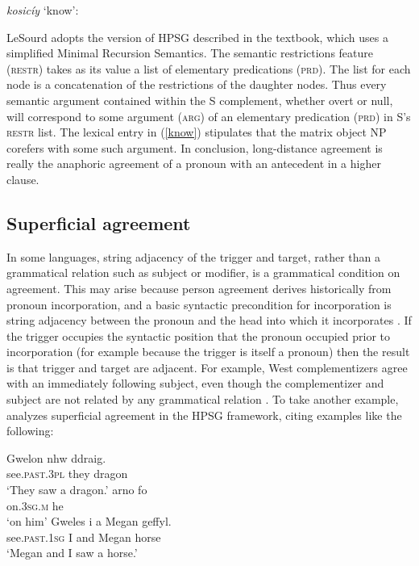 \documentclass[output=paper
 	        ,biblatex
                ,babelshorthands
                ,newtxmath
                ,draftmode
                ,colorlinks, citecolor=brown
]{langscibook}
\begin{document}
 \begin{exe}
\ex\label{know}
\textit{kosic\'{i}y} `know': \\
\end{exe}

\noindent
LeSourd adopts the version of HPSG described in the \citet{Sag+etal:2003} textbook, which uses a simplified Minimal Recursion Semantics. The semantic restrictions feature (\textsc{restr}) takes as its value a list of elementary predications (\textsc{prd}).  The list for each node is a concatenation of the restrictions of the daughter nodes.  Thus every semantic argument contained within the S complement, whether overt or null, will correspond to some argument (\textsc{arg}) of an elementary predication (\textsc{prd}) in S's \textsc{restr} list.  The lexical entry in (\ref{know}) stipulates that the matrix object NP corefers with some such argument.    In conclusion,  long-distance agreement is really the anaphoric agreement of a pronoun with an antecedent in a higher clause.  


\subsection{Superficial agreement}

 In some languages, string adjacency of the trigger and target, rather than a grammatical relation such as subject or modifier, is a grammatical condition on agreement. This may arise because person agreement derives historically from pronoun incorporation, and a basic syntactic precondition for incorporation is string adjacency between the pronoun and the head into which it incorporates \citep{givon:1976,ariel:1999,wechsler+epps+coppock:2010,fuss:2005}.  If the trigger occupies the syntactic position that the pronoun occupied prior to incorporation (for example because the trigger is itself a pronoun) then the result is that trigger and target are adjacent.  For example, West  complementizers agree with an immediately following subject, even though the complementizer and subject are not related by any grammatical relation \citep{Haegeman:1992}.  To take another example, \citet{Borsley:2009} analyzes  superficial agreement in the HPSG framework, citing examples like the following:

\begin{exe}
\ex \label{welsh}
\begin{xlist}
\ex
\gll 	Gwelon nhw ddraig. \\
see.\textsc{past.3pl} they dragon \\
\glt `They saw a dragon.’
\ex 
\gll 	arno fo \\
on.\textsc{3sg.m} he \\
\glt `on him’
\ex 
\gll 	Gweles i a Megan geffyl. \\
see.\textsc{past.1sg} I and Megan horse \\
\glt `Megan and I saw a horse.’
\end{xlist}
\end{exe}
\end{document}
